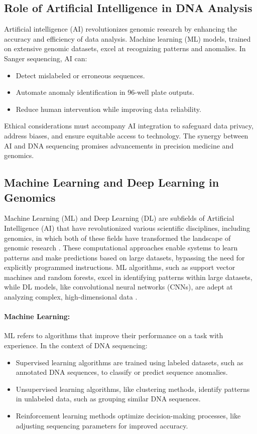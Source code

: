 \subsection{Role of Artificial Intelligence in DNA Analysis}
Artificial intelligence (AI) revolutionizes genomic research by enhancing the accuracy and efficiency of data analysis. Machine learning (ML) models, trained on extensive genomic datasets, excel at recognizing patterns and anomalies. In Sanger sequencing, AI can:
\begin{itemize}
\item Detect mislabeled or erroneous sequences.
\item Automate anomaly identification in 96-well plate outputs.
\item Reduce human intervention while improving data reliability.
\end{itemize}

Ethical considerations must accompany AI integration to safeguard data privacy, address biases, and ensure equitable access to technology. The synergy between AI and DNA sequencing promises advancements in precision medicine and genomics.

\subsection{Machine Learning and Deep Learning in Genomics}
Machine Learning (ML) and Deep Learning (DL) are subfields of Artificial Intelligence (AI) that have revolutionized various scientific disciplines, including genomics, in which both of these fields have transformed the landscape of genomic research \cite{ml_genomics_review}. These computational approaches enable systems to learn patterns and make predictions based on large datasets, bypassing the need for explicitly programmed instructions.
ML algorithms, such as support vector machines and random forests, excel in identifying patterns within large datasets, while DL models, like convolutional neural networks (CNNs), are adept at analyzing complex, high-dimensional data \cite{libbrecht_ml_genomics,dl_methods_genomics}.

\paragraph{Machine Learning:}
ML refers to algorithms that improve their performance on a task with experience. In the context of DNA sequencing:
\begin{itemize}
\item Supervised learning algorithms are trained using labeled datasets, such as annotated DNA sequences, to classify or predict sequence anomalies.
\item Unsupervised learning algorithms, like clustering methods, identify patterns in unlabeled data, such as grouping similar DNA sequences.
\item Reinforcement learning methods optimize decision-making processes, like adjusting sequencing parameters for improved accuracy.
\end{itemize}

